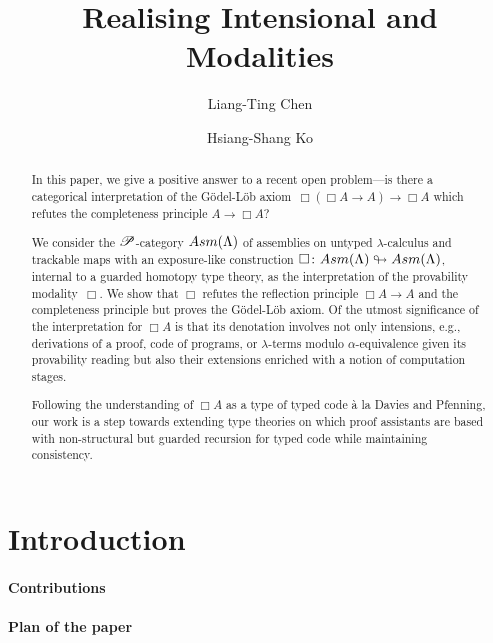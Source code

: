 \documentclass[a4paper,UKenglish,numberwithinsect,cleveref,thm-restate]{lipics-v2021}
\title{Realising Intensional \SFour and \GL Modalities}
\author{Liang-Ting Chen}%
  {Institute of Information Science, Academia Sinica, Taiwan~\url{https://l-tchen.github.io}}%
  {liang.ting.chen.tw@gmail.com}%
  {https://orcid.org/0000-0002-3250-1331}{}
\author{Hsiang-Shang Ko}%
  {Institute of Information Science, Academia Sinica, Taiwan~\url{https://josh-hs-ko.github.io}}%
  {joshko@iis.sinica.edu.tw}%
  {https://orcid.org/0000-0002-2439-1048}{}
\numberwithin{equation}{section}
\theoremstyle{plain}
\begin{document}
\maketitle

\begin{abstract}
  In this paper, we give a positive answer to a recent open problem---is there a categorical interpretation of the Gödel-Löb axiom~$\Box (\Box A \to A) \to \Box A$ which refutes the completeness principle $A \to \Box A$?

  We consider the $\mathscr{P}$-category $\Asm(\Lambda)$ of assemblies on untyped $\lambda$-calculus and trackable maps with an exposure-like construction $\Box\colon \Asm(\Lambda) \looparrowright \Asm(\Lambda)$, internal to a guarded homotopy type theory, as the interpretation of the provability modality~$\Box$.
  We show that $\Box$ refutes the reflection principle $\Box A \to A$ and the completeness principle but proves the Gödel-Löb axiom.
  Of the utmost significance of the interpretation for $\Box A$ is that its denotation involves not only intensions, e.g., derivations of a proof, code of programs, or $\lambda$-terms modulo $\alpha$-equivalence given its provability reading but also their extensions enriched with a notion of computation stages. 

  Following the understanding of $\Box A$ as a type of typed code \`a la Davies and Pfenning, our work is a step towards extending type theories on which proof assistants are based with non-structural but guarded recursion for typed code while maintaining consistency.
\end{abstract}

\section{Introduction}\label{sec:intro}
\cite{Litak2014,Davies2001b}

\paragraph*{Contributions}

\paragraph*{Plan of the paper}
\end{document}

